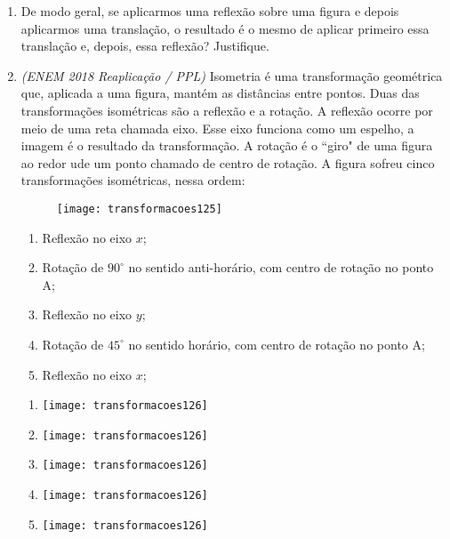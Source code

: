 \begin{enumerate}
\item De modo geral, se aplicarmos uma reflexão sobre uma figura e depois aplicarmos uma translação, o resultado é o mesmo de aplicar primeiro essa translação e, depois, essa reflexão? Justifique. 

\item \textit{(ENEM 2018 Reaplicação / PPL)} Isometria é uma transformação geométrica que, aplicada a uma figura, mantém as distâncias entre pontos. Duas das transformações isométricas são a reflexão e a rotação. A reflexão ocorre por meio de uma reta chamada eixo. Esse eixo funciona como um espelho, a imagem é o resultado da transformação. A rotação é o ``giro" de uma figura ao redor ude um ponto chamado de centro de rotação. A figura sofreu cinco transformações isométricas, nessa ordem:

\begin{figure}[H]
\centering

\texttt{[image: transformacoes125]}
\end{figure}

\begin{enumerate}[label=\arabic*\super{a})]
\item Reflexão no eixo $x$;
\item Rotação de $90^{\circ}$ no sentido anti-horário, com centro de rotação no ponto A;
\item Reflexão no eixo $y$;
\item Rotação de $45^{\circ}$ no sentido horário, com centro de rotação no ponto A;
\item Reflexão no eixo $x$;
\end{enumerate}

\begin{multicols}{2}
\begin{enumerate}[itemsep=1em]
\item {}
{
\texttt{[image: transformacoes126]}
}

\item {}
{
\texttt{[image: transformacoes126]}
}
\item {}
{
\texttt{[image: transformacoes126]}
}
\item {}
{
\texttt{[image: transformacoes126]}
}
\item {}
{
\texttt{[image: transformacoes126]}
} 
\end{enumerate}
\end{multicols}


\end{enumerate}
